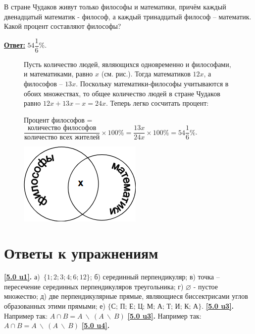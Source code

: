 \begin{thm}
В стране Чудаков живут только философы и математики, причём каждый двенадцатый математик - философ, а каждый тринадцатый философ – математик. Какой процент составляют философы?
\end{thm}
\par
\textbf{\underline{Ответ:}} $54\dfrac{1}{6}\%$.

\begin{figure}[H]
\begin{minipage}{0.7\linewidth}\setlength{\parindent}{1.5em}
    \begin{prf} 
    Пусть количество людей, являющихся одновременно и философами, и математиками, равно $x$ (см. рис.). Тогда математиков $12x$, а философов – $13x$. Поскольку математики-философы учитываются в обоих множествах, то общее количество людей в стране Чудаков равно $12x + 13x - x = 24x$. Теперь легко сосчитать процент:
    \par
    Процент философов = $\dfrac{\textit{количество философов}}{\textit{количество всех жителей}} \times 100\% = \dfrac{13x}{24x} \times 100\% = 54\dfrac{1}{6}\%$.
    \end{prf}
\end{minipage}
\hfill
\begin{minipage}{0.25\linewidth}%
    \includegraphics[width=0.9\columnwidth]{img/filosof.png}
\end{minipage}
\end{figure}

\section{Ответы к упражнениям}

\textbf{\ref{5.0 u1}.} а)~$\{1; 2; 3; 4; 6; 12\}$; б) серединный перпендикуляр; в) точка – пересечение серединных перпендикуляров треугольника; г) $\varnothing$ - пустое множество; д) две перпендикулярные прямые, являющиеся биссектрисами углов образованных этими прямыми; е) $\{\textit{С; П; Е; Ц; М; А; Т; И; К; А}\}$. 
\textbf{\ref{5.0 u3}.} Например так: $A \cap B = A~\backslash~(A~\backslash~B)$
\textbf{\ref{5.0 u3}.} Например так: $A \cap B = A~\backslash~(A~\backslash~B)$
\textbf{\ref{5.0 u4}.} 

